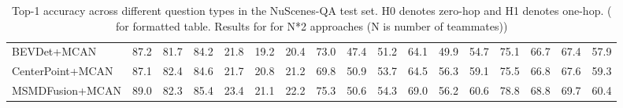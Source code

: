 \documentclass{article} %
\begin{document}
\begin{table}[ht]
{\begin{tabular}{lcccccccccccccccc}
				BEVDet+MCAN          & 87.2 & 81.7 & 84.2 & 21.8 & 19.2 & 20.4 & 73.0 & 47.4 & 51.2 & 64.1 & 49.9 & 54.7 & 75.1 & 66.7 & 67.4 & 57.9 \\
				CenterPoint+MCAN     & 87.1 & 82.4 & 84.6 & 21.7 & 20.8 & 21.2 & 69.8 & 50.9 & 53.7 & 64.5 & 56.3 & 59.1 & 75.5 & 66.8 & 67.6 & 59.3 \\
				MSMDFusion+MCAN      & 89.0 & 82.3 & 85.4 & 23.4 & 21.1 & 22.2 & 75.3 & 50.6 & 54.3 & 69.0 & 56.2 & 60.6 & 78.8 & 68.8 & 69.7 & 60.4 \\
				\bottomrule
			\end{tabular}
		}
		\caption{Top-1 accuracy across different question types in the NuScenes-QA test set. H0 denotes zero-hop and H1 denotes one-hop. ({ for formatted table.  Results for for N*2 approaches (N is number of teammates)})}
	\end{table}
	
	

	
\end{document}
